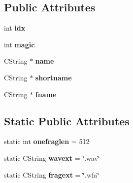 \subsection*{Public Attributes}
\begin{DoxyCompactItemize}
\item 
\hypertarget{class_c_frag_a3dffdae461ee3a3e3b9223a8752bbbb1}{int {\bfseries idx}}\label{class_c_frag_a3dffdae461ee3a3e3b9223a8752bbbb1}

\item 
\hypertarget{class_c_frag_a08c750afcd09da1dcab4b8ee454940d0}{int {\bfseries magic}}\label{class_c_frag_a08c750afcd09da1dcab4b8ee454940d0}

\item 
\hypertarget{class_c_frag_a5724e3125c96746be4837750941a7e6a}{C\-String $\ast$ {\bfseries name}}\label{class_c_frag_a5724e3125c96746be4837750941a7e6a}

\item 
\hypertarget{class_c_frag_a2ee629d016cc70f4aac4767c5f6d6062}{C\-String $\ast$ {\bfseries shortname}}\label{class_c_frag_a2ee629d016cc70f4aac4767c5f6d6062}

\item 
\hypertarget{class_c_frag_a915d9687e17835ba674b904b8f7904bc}{C\-String $\ast$ {\bfseries fname}}\label{class_c_frag_a915d9687e17835ba674b904b8f7904bc}

\end{DoxyCompactItemize}
\subsection*{Static Public Attributes}
\begin{DoxyCompactItemize}
\item 
\hypertarget{class_c_frag_acbf964951702efcd7c6593373f7b118b}{static int {\bfseries onefraglen} = 512}\label{class_c_frag_acbf964951702efcd7c6593373f7b118b}

\item 
\hypertarget{class_c_frag_abdbb0c9a2e023484e661843ffbb86f36}{static C\-String {\bfseries wavext} = \char`\"{}.wav\char`\"{}}\label{class_c_frag_abdbb0c9a2e023484e661843ffbb86f36}

\item 
\hypertarget{class_c_frag_a79aab053c34cce4956fb429bc9cd8f79}{static C\-String {\bfseries fragext} = \char`\"{}.wfa\char`\"{}}\label{class_c_frag_a79aab053c34cce4956fb429bc9cd8f79}

\end{DoxyCompactItemize}

